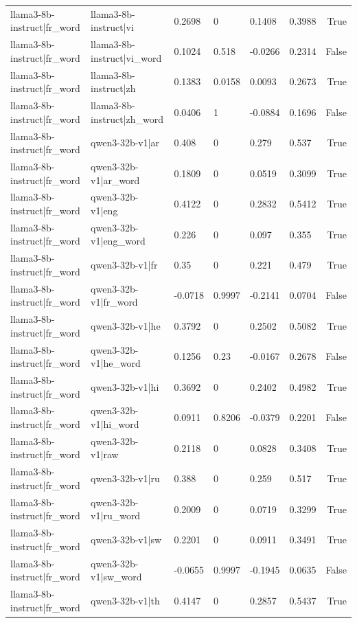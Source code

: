 \begin{table}
\begin{tabular}{llllllr}
llama3-8b-instruct|fr_word & llama3-8b-instruct|vi & 0.2698 & 0 & 0.1408 & 0.3988 & True \\
llama3-8b-instruct|fr_word & llama3-8b-instruct|vi_word & 0.1024 & 0.518 & -0.0266 & 0.2314 & False \\
llama3-8b-instruct|fr_word & llama3-8b-instruct|zh & 0.1383 & 0.0158 & 0.0093 & 0.2673 & True \\
llama3-8b-instruct|fr_word & llama3-8b-instruct|zh_word & 0.0406 & 1 & -0.0884 & 0.1696 & False \\
llama3-8b-instruct|fr_word & qwen3-32b-v1|ar & 0.408 & 0 & 0.279 & 0.537 & True \\
llama3-8b-instruct|fr_word & qwen3-32b-v1|ar_word & 0.1809 & 0 & 0.0519 & 0.3099 & True \\
llama3-8b-instruct|fr_word & qwen3-32b-v1|eng & 0.4122 & 0 & 0.2832 & 0.5412 & True \\
llama3-8b-instruct|fr_word & qwen3-32b-v1|eng_word & 0.226 & 0 & 0.097 & 0.355 & True \\
llama3-8b-instruct|fr_word & qwen3-32b-v1|fr & 0.35 & 0 & 0.221 & 0.479 & True \\
llama3-8b-instruct|fr_word & qwen3-32b-v1|fr_word & -0.0718 & 0.9997 & -0.2141 & 0.0704 & False \\
llama3-8b-instruct|fr_word & qwen3-32b-v1|he & 0.3792 & 0 & 0.2502 & 0.5082 & True \\
llama3-8b-instruct|fr_word & qwen3-32b-v1|he_word & 0.1256 & 0.23 & -0.0167 & 0.2678 & False \\
llama3-8b-instruct|fr_word & qwen3-32b-v1|hi & 0.3692 & 0 & 0.2402 & 0.4982 & True \\
llama3-8b-instruct|fr_word & qwen3-32b-v1|hi_word & 0.0911 & 0.8206 & -0.0379 & 0.2201 & False \\
llama3-8b-instruct|fr_word & qwen3-32b-v1|raw & 0.2118 & 0 & 0.0828 & 0.3408 & True \\
llama3-8b-instruct|fr_word & qwen3-32b-v1|ru & 0.388 & 0 & 0.259 & 0.517 & True \\
llama3-8b-instruct|fr_word & qwen3-32b-v1|ru_word & 0.2009 & 0 & 0.0719 & 0.3299 & True \\
llama3-8b-instruct|fr_word & qwen3-32b-v1|sw & 0.2201 & 0 & 0.0911 & 0.3491 & True \\
llama3-8b-instruct|fr_word & qwen3-32b-v1|sw_word & -0.0655 & 0.9997 & -0.1945 & 0.0635 & False \\
llama3-8b-instruct|fr_word & qwen3-32b-v1|th & 0.4147 & 0 & 0.2857 & 0.5437 & True \\

\end{tabular}
\end{table}
